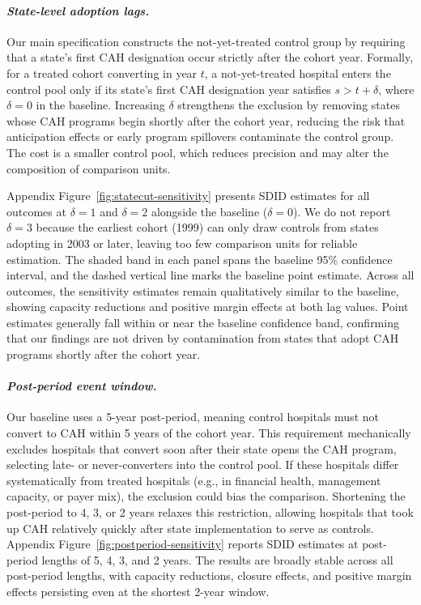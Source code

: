 \documentclass[a4paper, 12pt]{article}
\begin{document}
\paragraph{\textit{State-level adoption lags.}}
Our main specification constructs the not-yet-treated control group by requiring that a state's first CAH designation occur strictly after the cohort year. Formally, for a treated cohort converting in year $t$, a not-yet-treated hospital enters the control pool only if its state's first CAH designation year satisfies $s > t + \delta$, where $\delta = 0$ in the baseline. Increasing $\delta$ strengthens the exclusion by removing states whose CAH programs begin shortly after the cohort year, reducing the risk that anticipation effects or early program spillovers contaminate the control group. The cost is a smaller control pool, which reduces precision and may alter the composition of comparison units.

Appendix Figure~\ref{fig:statecut-sensitivity} presents SDID estimates for all outcomes at $\delta = 1$ and $\delta = 2$ alongside the baseline ($\delta = 0$). We do not report $\delta = 3$ because the earliest cohort (1999) can only draw controls from states adopting in 2003 or later, leaving too few comparison units for reliable estimation. The shaded band in each panel spans the baseline 95\% confidence interval, and the dashed vertical line marks the baseline point estimate. Across all outcomes, the sensitivity estimates remain qualitatively similar to the baseline, showing capacity reductions and positive margin effects at both lag values. Point estimates generally fall within or near the baseline confidence band, confirming that our findings are not driven by contamination from states that adopt CAH programs shortly after the cohort year.

\paragraph{\textit{Post-period event window.}}
Our baseline uses a 5-year post-period, meaning control hospitals must not convert to CAH within 5 years of the cohort year. This requirement mechanically excludes hospitals that convert soon after their state opens the CAH program, selecting late- or never-converters into the control pool. If these hospitals differ systematically from treated hospitals (e.g., in financial health, management capacity, or payer mix), the exclusion could bias the comparison. Shortening the post-period to 4, 3, or 2 years relaxes this restriction, allowing hospitals that took up CAH relatively quickly after state implementation to serve as controls. Appendix Figure~\ref{fig:postperiod-sensitivity} reports SDID estimates at post-period lengths of 5, 4, 3, and 2 years. The results are broadly stable across all post-period lengths, with capacity reductions, closure effects, and positive margin effects persisting even at the shortest 2-year window.
\end{document}

